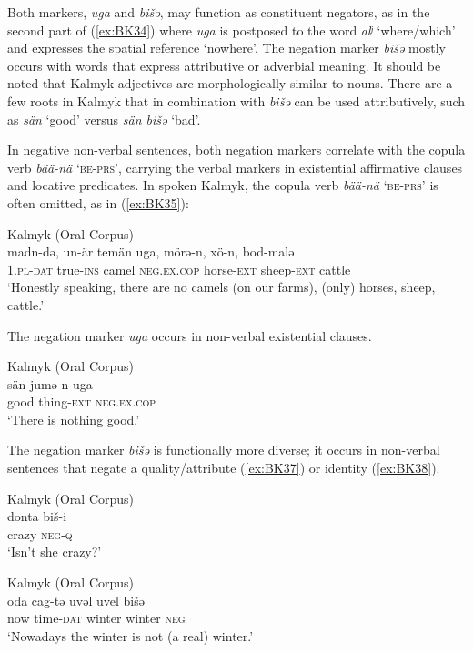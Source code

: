 \documentclass[output=paper]{langsci/langscibook}
\begin{document}
Both markers, \textit{uga} and \textit{bišǝ}, may function as constituent negators, as in the second part of (\ref{ex:BK34}) where \textit{uga} is postposed to the word \textit{alʲ} ‘where/which’ and expresses the spatial reference ‘nowhere’. The negation marker \textit{bišǝ} mostly occurs with words that express attributive or adverbial meaning. It should be noted that Kalmyk adjectives are morphologically similar to nouns. There are a few roots in Kalmyk that in combination with \textit{bišǝ} can be used attributively, such as \textit{sän} ‘good’ versus \textit{sän bišǝ} ‘bad’.

In negative non-verbal sentences, both negation markers correlate with the copula verb \textit{bää-nä} ‘\textsc{be-prs}’, carrying the verbal markers in existential affirmative clauses and locative predicates. In spoken Kalmyk, the copula verb \textit{bää-nä} ‘\textsc{be-prs}’ is often omitted, as in (\ref{ex:BK35}):

\ea Kalmyk (Oral Corpus) \label{ex:BK35}\\
	\gll madn-də,		un-är		temän	uga,	mörə-n,		xö-n,			bod-malə\\
	1.\textsc{pl-dat}		true-\textsc{ins}	camel	\textsc{neg.ex.cop}	horse-\textsc{ext}	sheep-\textsc{ext}	cattle\\
	\glt `Honestly speaking, there are no camels (on our farms), (only) horses, sheep, cattle.'
\z


The negation marker \textit{uga} occurs in non-verbal existential clauses.

\ea Kalmyk (Oral Corpus) \label{ex:BK36}\\
	\gll sän		jumǝ-n		uga\\
	good	thing-\textsc{ext}	\textsc{neg.ex.cop}\\
	\glt `There is nothing good.'
\z


The negation marker \textit{bišǝ} is functionally more diverse; it occurs in non-verbal sentences that negate a quality/attribute (\ref{ex:BK37}) or identity (\ref{ex:BK38}).

\ea Kalmyk (Oral Corpus) \label{ex:BK37}\\
	\gll donta		biš-i\\
	crazy		\textsc{neg-q}\\
	\glt `Isn’t she crazy?'
\z

\ea Kalmyk (Oral Corpus) \label{ex:BK38}\\
	\gll oda	cag-tə		uvəl		uvel		bišǝ\\
	now	time-\textsc{dat}	winter	winter	\textsc{neg}\\
	\glt `Nowadays the winter is not (a real) winter.'
\z
\end{document}
